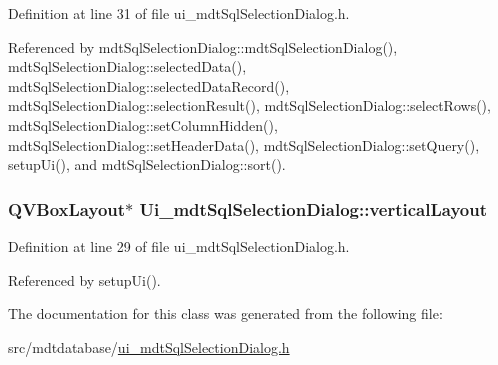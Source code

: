 Definition at line 31 of file ui\-\_\-mdt\-Sql\-Selection\-Dialog.\-h.



Referenced by mdt\-Sql\-Selection\-Dialog\-::mdt\-Sql\-Selection\-Dialog(), mdt\-Sql\-Selection\-Dialog\-::selected\-Data(), mdt\-Sql\-Selection\-Dialog\-::selected\-Data\-Record(), mdt\-Sql\-Selection\-Dialog\-::selection\-Result(), mdt\-Sql\-Selection\-Dialog\-::select\-Rows(), mdt\-Sql\-Selection\-Dialog\-::set\-Column\-Hidden(), mdt\-Sql\-Selection\-Dialog\-::set\-Header\-Data(), mdt\-Sql\-Selection\-Dialog\-::set\-Query(), setup\-Ui(), and mdt\-Sql\-Selection\-Dialog\-::sort().

\hypertarget{class_ui__mdt_sql_selection_dialog_affb3ab01a106df2d196a1fd0666278be}{
\subsubsection[{vertical\-Layout}]{\setlength{\rightskip}{0pt plus 5cm}Q\-V\-Box\-Layout$\ast$ Ui\-\_\-mdt\-Sql\-Selection\-Dialog\-::vertical\-Layout}}\label{class_ui__mdt_sql_selection_dialog_affb3ab01a106df2d196a1fd0666278be}


Definition at line 29 of file ui\-\_\-mdt\-Sql\-Selection\-Dialog.\-h.



Referenced by setup\-Ui().



The documentation for this class was generated from the following file\-:\begin{DoxyCompactItemize}
\item 
src/mdtdatabase/\hyperlink{ui__mdt_sql_selection_dialog_8h}{ui\-\_\-mdt\-Sql\-Selection\-Dialog.\-h}\end{DoxyCompactItemize}
